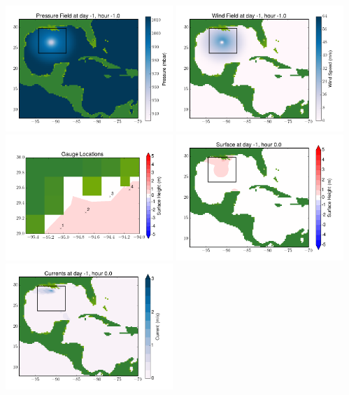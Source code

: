 \documentclass[11pt]{article}
\begin{document}
\includegraphics[width=0.475\textwidth]{frame0047fig8.png}
\vskip 10pt 
\includegraphics[width=0.475\textwidth]{frame0047fig9.png}
\includegraphics[width=0.475\textwidth]{frame0047fig10.png}
\vskip 10pt 
\includegraphics[width=0.475\textwidth]{frame0048fig1.png}
\includegraphics[width=0.475\textwidth]{frame0048fig2.png}
\end{document}
